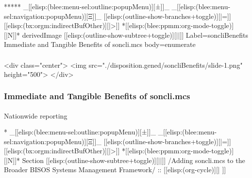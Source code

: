 \begin{whenOrg}
\begin{whenOrg}
*****  _[[elisp:(blee:menu-sel:outline:popupMenu)][±]]_ _[[elisp:(blee:menu-sel:navigation:popupMenu)][Ξ]]_ [[elisp:(outline-show-branches+toggle)][|=]] [[elisp:(bx:orgm:indirectBufOther)][|>]] *[[elisp:(blee:ppmm:org-mode-toggle)][|N]]*  derivedImage [[elisp:(outline-show-subtree+toggle)][||]] Label=soncliBenefits Immediate and Tangible Benefits of soncli.mcs body=enumerate
\end{whenOrg}

\begin{htmlonly}

\begin{frame}[fragile,plain,label=soncliBenefits]
    \frametitle{}
    \framesubtitle{}
    \begin{rawhtml}
<div class="center">
<img src="./disposition.gened/soncliBenefits/slide-1.png" height="500">
</div>
    \end{rawhtml}
\end{frame}
\end{htmlonly}

\begin{verblatex}

\begin{frame}[fragile,plain,label=soncliBenefits]
    \frametitle{Immediate and Tangible Benefits of soncli.mcs}
    \framesubtitle{}


    Nationwide reporting




\end{frame}
\end{verblatex}




\begin{whenOrg}
*  _[[elisp:(blee:menu-sel:outline:popupMenu)][±]]_ _[[elisp:(blee:menu-sel:navigation:popupMenu)][Ξ]]_ [[elisp:(outline-show-branches+toggle)][|=]] [[elisp:(bx:orgm:indirectBufOther)][|>]] *[[elisp:(blee:ppmm:org-mode-toggle)][|N]]*  Section    [[elisp:(outline-show-subtree+toggle)][||]]   /Adding soncli.mcs to the Broader BISOS Systems Management Framework/ ::  [[elisp:(org-cycle)][| ]]
\end{whenOrg}


\end{whenOrg}
